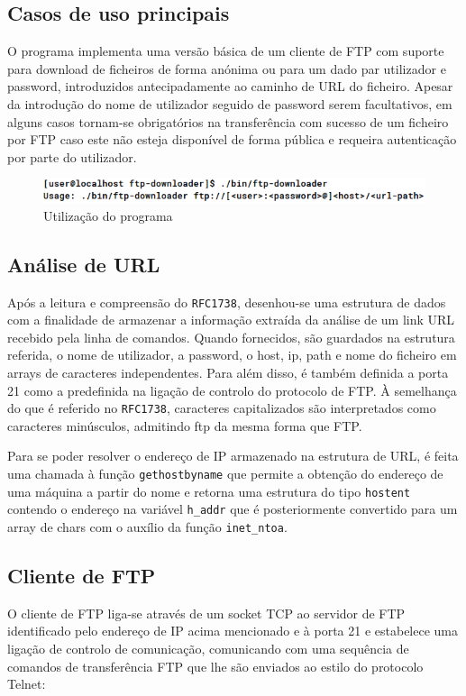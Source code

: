 \documentclass[a4paper,11pt,titlepage]{article}
\begin{document}
\subsection*{Casos de uso principais}

O programa implementa uma versão básica de um cliente de FTP com suporte para download de ficheiros de forma anónima ou para um dado par utilizador e password, introduzidos antecipadamente ao caminho de URL do ficheiro. 
Apesar da introdução do nome de utilizador seguido de password serem facultativos, em alguns casos tornam-se obrigatórios na transferência com sucesso de um ficheiro por FTP caso este não esteja disponível de forma pública e requeira autenticação por parte do utilizador.

\begin{figure}[H]
    \center
    \includegraphics[scale=0.6]{res/usage.png}
    \caption{Utilização do programa}
    \label{fig:usage.png}
\end{figure}

\subsection*{Análise de URL}
Após a leitura e compreensão do \texttt{RFC1738}, desenhou-se uma estrutura de dados com a finalidade de armazenar a informação extraída da análise de um link URL recebido pela linha de comandos. Quando fornecidos, são guardados na estrutura referida, o nome de utilizador, a password, o host, ip, path e nome do ficheiro em arrays de caracteres independentes. Para além disso, é também definida a porta 21 como a predefinida na ligação de controlo do protocolo de FTP. À semelhança do que é referido no \texttt{RFC1738}, caracteres capitalizados são interpretados como caracteres minúsculos, admitindo ftp da mesma forma que FTP.

Para se poder resolver o endereço de IP armazenado na estrutura de URL, é feita uma chamada à função \texttt{gethostbyname} que permite a obtenção do endereço de uma máquina a partir do nome e retorna uma estrutura do tipo \texttt{hostent} contendo o endereço na variável \texttt{h\_addr} que é posteriormente convertido para um array de chars com o auxílio da função \texttt{inet\_ntoa}.

\subsection*{Cliente de FTP}
O cliente de FTP liga-se através de um socket TCP ao servidor de FTP identificado pelo endereço de IP acima mencionado e à porta 21 e estabelece uma ligação de controlo de comunicação, comunicando com uma sequência de comandos de transferência FTP que lhe são enviados ao estilo do protocolo Telnet: 
\end{document}
